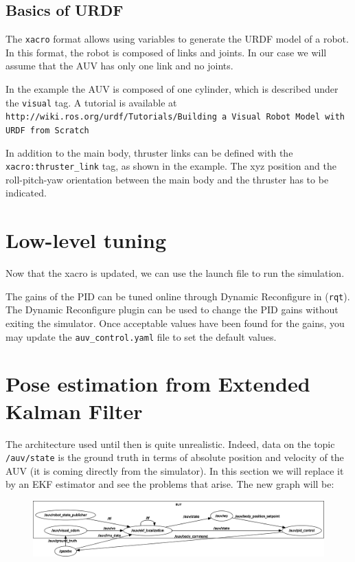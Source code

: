 \documentclass{ecnreport}
\begin{document}
\subsection{Basics of URDF}

The \texttt{xacro} format allows using variables to generate the URDF model of a robot. 
In this format, the robot is composed of links and joints. In our case we will assume that the AUV has only one link and no joints.

In the example the AUV is composed of one cylinder, which is described under the \texttt{visual} tag.
A tutorial is available at \texttt{http://wiki.ros.org/urdf/Tutorials/Building a Visual Robot Model with URDF from Scratch}

In addition to the main body, thruster links can be defined with the \texttt{xacro:thruster\_link} tag, as  shown in the example.
The xyz position and the roll-pitch-yaw orientation between the main body and the thruster has to be indicated.

\section{Low-level tuning}

Now that the xacro is updated, we can use the launch file to run the simulation.

The gains of the PID can be tuned online through Dynamic Reconfigure in (\texttt{rqt}).
The Dynamic Reconfigure plugin can be used to change the PID gains without exiting the simulator.
Once acceptable values have been found for the gains, you may update the \texttt{auv\_control.yaml} file to set the default values.

\section{Pose estimation from Extended Kalman Filter}

The architecture used until then is quite unrealistic.
Indeed, data on the topic \texttt{/auv/state} is the ground truth in terms of absolute position and velocity of the AUV (it is coming
directly from the simulator).
In this section we will replace it by an EKF estimator and see the problems that arise. The new graph will be:
\begin{figure}[h]\centering
 \includegraphics[width=\linewidth]{graph_ekf}
\end{figure}
\end{document}
